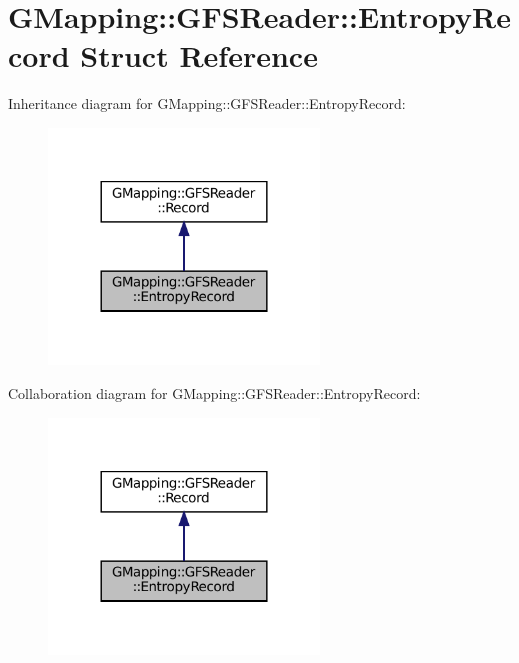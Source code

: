 \hypertarget{structGMapping_1_1GFSReader_1_1EntropyRecord}{}\section{G\+Mapping\+:\+:G\+F\+S\+Reader\+:\+:Entropy\+Record Struct Reference}
\label{structGMapping_1_1GFSReader_1_1EntropyRecord}


Inheritance diagram for G\+Mapping\+:\+:G\+F\+S\+Reader\+:\+:Entropy\+Record\+:
\nopagebreak
\begin{figure}[H]
\begin{center}
\leavevmode
\includegraphics[width=204pt]{structGMapping_1_1GFSReader_1_1EntropyRecord__inherit__graph}
\end{center}
\end{figure}


Collaboration diagram for G\+Mapping\+:\+:G\+F\+S\+Reader\+:\+:Entropy\+Record\+:
\nopagebreak
\begin{figure}[H]
\begin{center}
\leavevmode
\includegraphics[width=204pt]{structGMapping_1_1GFSReader_1_1EntropyRecord__coll__graph}
\end{center}
\end{figure}
